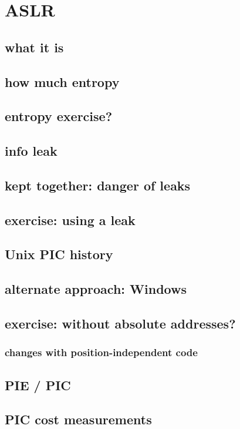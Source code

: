 

\section{ASLR}


\subsection{what it is}


\subsection{how much entropy}


\subsection{entropy exercise?}


\subsection{info leak}


\subsection{kept together: danger of leaks}


\subsection{exercise: using a leak}




\subsection{Unix PIC history}


\subsection{alternate approach: Windows}


\subsection{exercise: without absolute addresses?}


\subsubsection{changes with position-independent code}


\subsection{PIE / PIC}


\subsection{PIC cost measurements}

